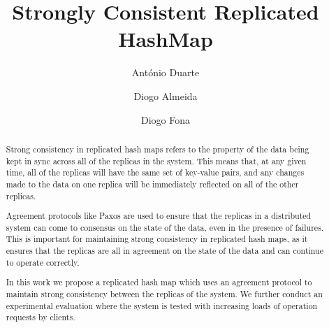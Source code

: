 \documentclass[sigconf]{acmart}
\begin{document}
\title{Strongly Consistent Replicated HashMap}

\author{António Duarte}

\author{Diogo Almeida}

\author{Diogo Fona}

\renewcommand{\shortauthors}{Duarte, Almeida, and Fona.}

\begin{abstract}
Strong consistency in replicated hash maps refers to the property of the data being kept in sync across all of the replicas in the system. This means that, at any given time, all of the replicas will have the same set of key-value pairs, and any changes made to the data on one replica will be immediately reflected on all of the other replicas.

Agreement protocols like Paxos are used to ensure that the replicas in a distributed system can come to consensus on the state of the data, even in the presence of failures. This is important for maintaining strong consistency in replicated hash maps, as it ensures that the replicas are all in agreement on the state of the data and can continue to operate correctly.

In this work we propose a replicated hash map which uses an agreement protocol to maintain strong consistency between the replicas of the system. We further conduct an experimental evaluation where the system is tested with increasing loads of operation requests by clients. 

\end{abstract}
\end{document}
